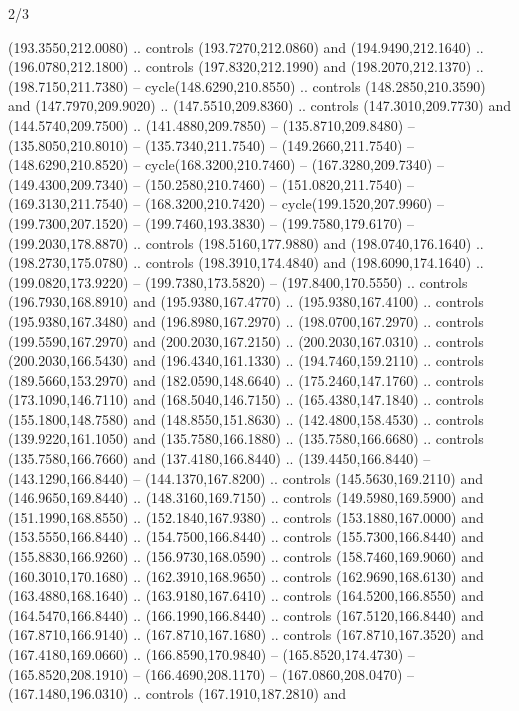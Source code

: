 \begin{flagdescription}{2/3}
\begin{scope}[xshift=0.5\flaglength,yshift=0.5\flagwidth,scale=\stretchfactor]
\begin{scope}[scale=0.001645\flagwidth,yshift=65mm,xshift=-63mm]
\begin{scope}[y=0.80pt, x=0.80pt, yscale=-1,]
\begin{scope}[cm={{1.33333,0.0,0.0,1.33333,(0.0,1e-05)}}]
  (193.3550,212.0080) .. controls (193.7270,212.0860) and (194.9490,212.1640) ..
  (196.0780,212.1800) .. controls (197.8320,212.1990) and (198.2070,212.1370) ..
  (198.7150,211.7380) -- cycle(148.6290,210.8550) .. controls
  (148.2850,210.3590) and (147.7970,209.9020) .. (147.5510,209.8360) .. controls
  (147.3010,209.7730) and (144.5740,209.7500) .. (141.4880,209.7850) --
  (135.8710,209.8480) -- (135.8050,210.8010) -- (135.7340,211.7540) --
  (149.2660,211.7540) -- (148.6290,210.8520) -- cycle(168.3200,210.7460) --
  (167.3280,209.7340) -- (149.4300,209.7340) -- (150.2580,210.7460) --
  (151.0820,211.7540) -- (169.3130,211.7540) -- (168.3200,210.7420) --
  cycle(199.1520,207.9960) -- (199.7300,207.1520) -- (199.7460,193.3830) --
  (199.7580,179.6170) -- (199.2030,178.8870) .. controls (198.5160,177.9880) and
  (198.0740,176.1640) .. (198.2730,175.0780) .. controls (198.3910,174.4840) and
  (198.6090,174.1640) .. (199.0820,173.9220) -- (199.7380,173.5820) --
  (197.8400,170.5550) .. controls (196.7930,168.8910) and (195.9380,167.4770) ..
  (195.9380,167.4100) .. controls (195.9380,167.3480) and (196.8980,167.2970) ..
  (198.0700,167.2970) .. controls (199.5590,167.2970) and (200.2030,167.2150) ..
  (200.2030,167.0310) .. controls (200.2030,166.5430) and (196.4340,161.1330) ..
  (194.7460,159.2110) .. controls (189.5660,153.2970) and (182.0590,148.6640) ..
  (175.2460,147.1760) .. controls (173.1090,146.7110) and (168.5040,146.7150) ..
  (165.4380,147.1840) .. controls (155.1800,148.7580) and (148.8550,151.8630) ..
  (142.4800,158.4530) .. controls (139.9220,161.1050) and (135.7580,166.1880) ..
  (135.7580,166.6680) .. controls (135.7580,166.7660) and (137.4180,166.8440) ..
  (139.4450,166.8440) -- (143.1290,166.8440) -- (144.1370,167.8200) .. controls
  (145.5630,169.2110) and (146.9650,169.8440) .. (148.3160,169.7150) .. controls
  (149.5980,169.5900) and (151.1990,168.8550) .. (152.1840,167.9380) .. controls
  (153.1880,167.0000) and (153.5550,166.8440) .. (154.7500,166.8440) .. controls
  (155.7300,166.8440) and (155.8830,166.9260) .. (156.9730,168.0590) .. controls
  (158.7460,169.9060) and (160.3010,170.1680) .. (162.3910,168.9650) .. controls
  (162.9690,168.6130) and (163.4880,168.1640) .. (163.9180,167.6410) .. controls
  (164.5200,166.8550) and (164.5470,166.8440) .. (166.1990,166.8440) .. controls
  (167.5120,166.8440) and (167.8710,166.9140) .. (167.8710,167.1680) .. controls
  (167.8710,167.3520) and (167.4180,169.0660) .. (166.8590,170.9840) --
  (165.8520,174.4730) -- (165.8520,208.1910) -- (166.4690,208.1170) --
  (167.0860,208.0470) -- (167.1480,196.0310) .. controls (167.1910,187.2810) and

\end{scope}
\end{scope}
\end{scope}
\end{scope}
\end{flagdescription}
